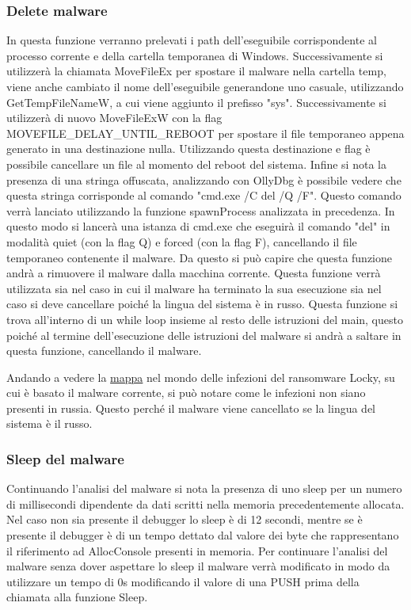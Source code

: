 \documentclass[a4paper,12pt]{article}
\begin{document}
\subsubsection{Delete malware}
In questa funzione verranno prelevati i path dell'eseguibile corrispondente al processo corrente e della cartella temporanea di Windows. Successivamente si utilizzerà la chiamata MoveFileEx per spostare il malware nella cartella temp, viene anche cambiato il nome dell'eseguibile generandone uno casuale, utilizzando GetTempFileNameW, a cui viene aggiunto il prefisso "sys".  Successivamente si utilizzerà di nuovo MoveFileExW con la flag MOVEFILE\_DELAY\_UNTIL\_REBOOT per spostare il file temporaneo appena generato in una destinazione nulla. Utilizzando questa destinazione e flag è possibile cancellare un file al momento del reboot del sistema. 
Infine si nota la presenza di una stringa offuscata, analizzando con OllyDbg è possibile vedere che questa stringa corrisponde al comando "cmd.exe /C del /Q /F". Questo comando verrà lanciato utilizzando la funzione spawnProcess analizzata in precedenza. In questo modo si lancerà una istanza di cmd.exe che eseguirà il comando "del" in modalità quiet (con la flag Q) e forced (con la flag F), cancellando il file temporaneo contenente il malware. Da questo si può capire che questa funzione andrà a rimuovere il malware dalla macchina corrente. Questa funzione verrà utilizzata sia nel caso in cui il malware ha terminato la sua esecuzione sia nel caso si deve cancellare poiché la lingua del sistema è in russo.  Questa funzione si trova all'interno di un while loop insieme al resto delle istruzioni del main, questo poiché al termine dell'esecuzione delle istruzioni del malware si andrà a saltare in questa funzione, cancellando il malware. 

Andando a vedere la \href{https://www.enterprisetimes.co.uk/2017/09/27/another-wave-locky-ransomware-arrives/}{mappa} nel mondo delle infezioni del ransomware Locky, su cui è basato il malware corrente, si può notare come le infezioni non siano presenti in russia. Questo perché il malware viene cancellato se la lingua del sistema è il russo.

\subsubsection{Sleep del malware}
Continuando l'analisi del malware si nota la presenza di uno sleep per un numero di millisecondi dipendente da dati scritti nella memoria precedentemente allocata. Nel caso non sia presente il debugger lo sleep è di 12 secondi, mentre se è presente il debugger è di un tempo dettato dal valore dei byte che rappresentano il riferimento ad AllocConsole presenti in memoria. 
Per continuare l'analisi del malware senza dover aspettare lo sleep il malware verrà modificato in modo da utilizzare un tempo di 0s modificando il valore di una PUSH prima della chiamata alla funzione Sleep. 
\end{document}
